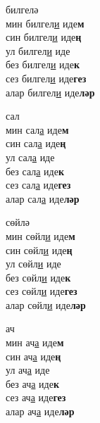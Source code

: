 \begin{multicols}{4}
\begin{enumerate}
\begin{minipage}{\linewidth}
    \item
    билгелә\\
    мин билгел\underline{и} иде\textbf{м}\\
    син билгел\underline{и} иде\textbf{ң}\\
    ул билгел\underline{и} иде\\
    без билгел\underline{и} иде\textbf{к}\\
    сез билгел\underline{и} иде\textbf{гез}\\
    алар билгел\underline{и} иде\textbf{ләр}\\
\end{minipage}

\begin{minipage}{\linewidth}
    \item
    сал\\
    мин сал\underline{а} иде\textbf{м}\\
    син сал\underline{а} иде\textbf{ң}\\
    ул сал\underline{а} иде\\
    без сал\underline{а} иде\textbf{к}\\
    сез сал\underline{а} иде\textbf{гез}\\
    алар сал\underline{а} иде\textbf{ләр}\\
\end{minipage}

\begin{minipage}{\linewidth}
    \item
    сөйлә\\
    мин сөйл\underline{и} иде\textbf{м}\\
    син сөйл\underline{и} иде\textbf{ң}\\
    ул сөйл\underline{и} иде\\
    без сөйл\underline{и} иде\textbf{к}\\
    сез сөйл\underline{и} иде\textbf{гез}\\
    алар сөйл\underline{и} иде\textbf{ләр}\\
\end{minipage}

\begin{minipage}{\linewidth}
    \item
    ач\\
    мин ач\underline{а} иде\textbf{м}\\
    син ач\underline{а} иде\textbf{ң}\\
    ул ач\underline{а} иде\\
    без ач\underline{а} иде\textbf{к}\\
    сез ач\underline{а} иде\textbf{гез}\\
    алар ач\underline{а} иде\textbf{ләр}\\
\end{minipage}


\end{enumerate}
\end{multicols}
